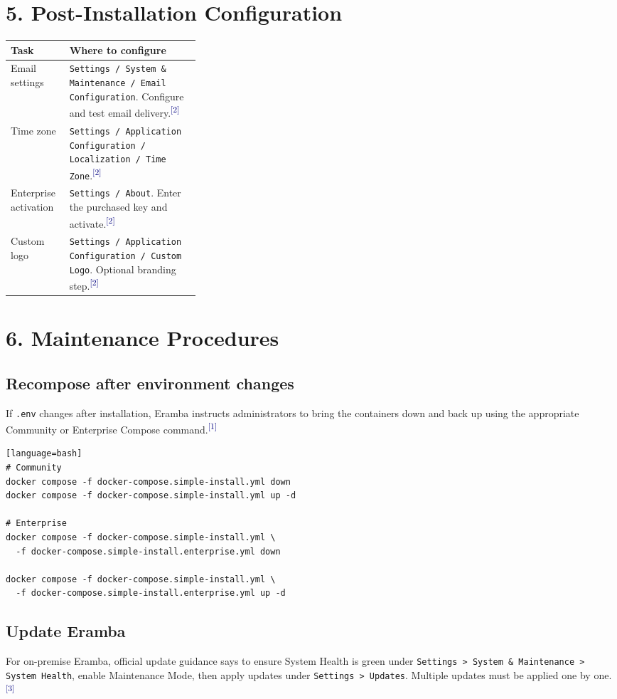 \documentclass[10pt,letterpaper]{article}
\newcommand{\source}[1]{\textsuperscript{\textcolor{navy}{#1}}}
\begin{document}
\section{5. Post-Installation Configuration}
\begin{center}
\begin{tabularx}{\linewidth}{L{0.31\linewidth}Y}
\toprule
\textbf{Task} & \textbf{Where to configure} \\
\midrule
Email settings & \texttt{Settings / System \& Maintenance / Email Configuration}. Configure and test email delivery.\source{[2]} \\
Time zone & \texttt{Settings / Application Configuration / Localization / Time Zone}.\source{[2]} \\
Enterprise activation & \texttt{Settings / About}. Enter the purchased key and activate.\source{[2]} \\
Custom logo & \texttt{Settings / Application Configuration / Custom Logo}. Optional branding step.\source{[2]} \\
\bottomrule
\end{tabularx}
\end{center}

\section{6. Maintenance Procedures}
\subsection{Recompose after environment changes}
If \texttt{.env} changes after installation, Eramba instructs administrators to bring the containers down and back up using the appropriate Community or Enterprise Compose command.\source{[1]}

\begin{verbatim}[language=bash]
# Community
docker compose -f docker-compose.simple-install.yml down
docker compose -f docker-compose.simple-install.yml up -d

# Enterprise
docker compose -f docker-compose.simple-install.yml \
  -f docker-compose.simple-install.enterprise.yml down

docker compose -f docker-compose.simple-install.yml \
  -f docker-compose.simple-install.enterprise.yml up -d
\end{verbatim}

\subsection{Update Eramba}
For on-premise Eramba, official update guidance says to ensure System Health is green under \texttt{Settings > System \& Maintenance > System Health}, enable Maintenance Mode, then apply updates under \texttt{Settings > Updates}. Multiple updates must be applied one by one.\source{[3]}
\end{document}
